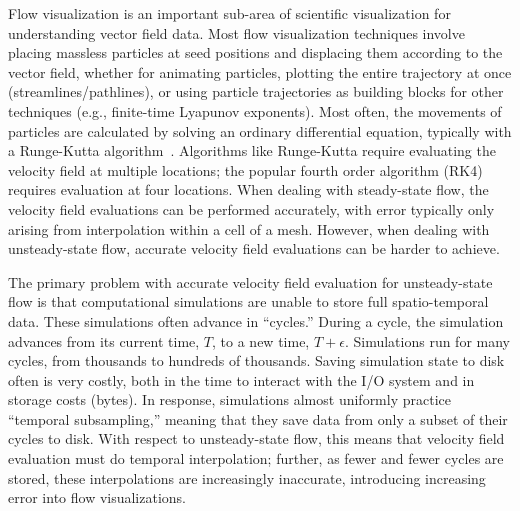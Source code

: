 
Flow visualization is an important sub-area of scientific visualization for
understanding vector field data.
%
Most flow visualization techniques involve placing massless particles at seed positions
and displacing them according to the vector field,
whether for animating particles, plotting the entire trajectory at once (streamlines/pathlines),
or using particle trajectories as building blocks for other techniques (e.g., finite-time Lyapunov exponents).
%
Most often, the movements of particles are calculated by solving an ordinary differential equation, typically
with a Runge-Kutta algorithm~\cite{cash1990variable}.
%
%
Algorithms like Runge-Kutta require evaluating the velocity field at multiple locations;
the popular fourth order algorithm (RK4) requires evaluation at four locations.
%
When dealing with steady-state flow, the velocity field evaluations can be performed accurately,
with error typically only arising from interpolation within a cell of a mesh.
%
However, when dealing with unsteady-state flow, accurate velocity field evaluations can be 
harder to achieve.

The primary problem with accurate velocity field evaluation for unsteady-state flow 
is that computational simulations are unable to store full spatio-temporal data.
%
These simulations often advance in ``cycles.''
%
During a cycle, the simulation advances from its current time, $T$, to a new time, $T+\epsilon$.
%
%
Simulations run for many cycles, from thousands to hundreds of thousands.
%
%
Saving simulation state to disk often is very costly, both in the time to interact with the I/O system and in
storage costs (bytes).
%
%
In response, simulations almost uniformly practice ``temporal subsampling,''
meaning that they save data from only a subset of their cycles to disk.
%
With respect to unsteady-state flow, this means that velocity field evaluation must
do temporal interpolation; further, as fewer and fewer cycles are stored, these interpolations
are increasingly inaccurate, introducing increasing error into flow visualizations.


